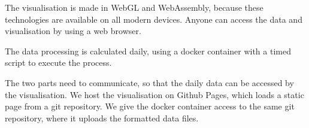 \documentclass[10pt, a4paper]{article}
\begin{document}
\begin{multicols}{2}
The visualisation is made in WebGL and WebAssembly, because these technologies are available on all modern devices. Anyone can access the data and visualisation by using a web browser. 

The data processing is calculated daily, using a docker container with a timed script to execute the process. 

The two parts need to communicate, so that the daily data can be accessed by the visualisation. We host the visualisation on Github Pages, which loads a static page from a git repository. We give the docker container access to the same git repository, where it uploads the formatted data files.












\end{multicols}
\end{document}
